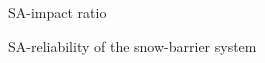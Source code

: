 \documentclass[fleqn]{article}
\begin{document}
\begin{figure}[ht!]
  \begin{center}
    \caption{SA-impact ratio}
    \label{impactratio}
  \end{center}
\end{figure}


\begin{figure}[ht!]
  \begin{center}
    \caption{SA-reliability of the snow-barrier system}
    \label{reliabilitySPS}
  \end{center}
\end{figure}
\end{document}
